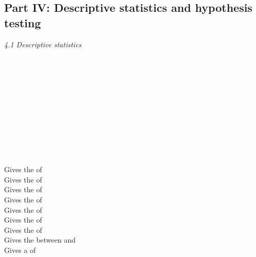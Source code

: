 \subsection{Part IV: Descriptive statistics and hypothesis testing}

\textit{4.1 Descriptive statistics} \\
\\
\begin{minipage}[t]{.4\textwidth}
\vspace*{-8pt}
 \\ 
 \\
 \\
 \\ 
 \\	
 \\
 \\
 \\
 \\
\end{minipage}
\begin{minipage}[t]{.6\textwidth}
Gives the  of  \\
Gives the  of  \\
Gives the  of  \\
Gives the  of  \\
Gives the  of  \\
Gives the  of  \\
Gives the  of  \\
Gives the  between  and  \\
Gives a  of   \\
\end{minipage}
\vspace*{.5cm}


